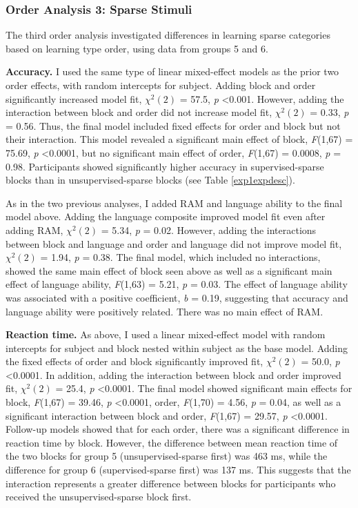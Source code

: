 \documentclass[../dissertation.tex]{subfiles}
\begin{document}
\subsubsection{Order Analysis 3: Sparse Stimuli}
	The third order analysis investigated differences in learning sparse categories based on learning type order, using data from groups 5 and 6. \par 
	\textbf{Accuracy.} I used the same type of linear mixed-effect models as the prior two order effects, with random intercepts for subject. Adding block and order significantly increased model fit, $\chi^{2}(2)$ = 57.5, \textit{p} \textless 0.001. However, adding the interaction between block and order did not increase model fit, $\chi^{2}(2)$ = 0.33, \textit{p} = 0.56. Thus, the final model included fixed effects for order and block but not their interaction. This model revealed a significant main effect of block, \textit{F}(1,67) = 75.69, \textit{p} \textless 0.0001, but no significant main effect of order, \textit{F}(1,67) = 0.0008, \textit{p} = 0.98. Participants showed significantly higher accuracy in supervised-sparse blocks than in unsupervised-sparse blocks (see Table \ref{exp1expdesc}). \par 
	As in the two previous analyses, I added RAM and language ability to the final model above. Adding the language composite improved model fit even after adding RAM, $\chi^{2}(2)$ = 5.34, \textit{p} = 0.02. However, adding the interactions between block and language and order and language did not improve model fit, $\chi^{2}(2)$ = 1.94, \textit{p} = 0.38. The final model, which included no interactions, showed the same main effect of block seen above as well as a significant main effect of language ability, \textit{F}(1,63) = 5.21, \textit{p} = 0.03. The effect of language ability was associated with a positive coefficient, \textit{b} = 0.19, suggesting that accuracy and language ability were positively related. There was no main effect of RAM. \par 
	\textbf{Reaction time.} As above, I used a linear mixed-effect model with random intercepts for subject and block nested within subject as the base model. Adding the fixed effects of order and block significantly improved fit, $\chi^{2}(2)$ = 50.0, \textit{p} \textless 0.0001. In addition, adding the interaction between block and order improved fit,  $\chi^{2}(2)$ = 25.4, \textit{p} \textless 0.0001. The final model showed significant main effects for block, \textit{F}(1,67) = 39.46, \textit{p} \textless 0.0001, order, \textit{F}(1,70) = 4.56, \textit{p} = 0.04, as well as a significant interaction between block and order, \textit{F}(1,67) = 29.57, \textit{p} \textless 0.0001. Follow-up models showed that for each order, there was a significant difference in reaction time by block. However, the difference between mean reaction time of the two blocks for group 5 (unsupervised-sparse first) was 463 ms, while the difference for group 6 (supervised-sparse first) was 137 ms. This suggests that the interaction represents a greater difference between blocks for participants who received the unsupervised-sparse block first.  \par 
\end{document}
